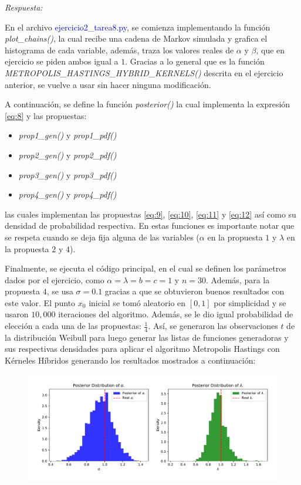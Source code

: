 \textcolor{BrickRed}{\it Respuesta:}

En el archivo \textcolor{mediumblue}{ejercicio2\_tarea8.py}, se comienza implementando la función \textit{plot\_chains()}, la cual recibe una cadena de Markov simulada y grafica el histograma de cada variable, además, traza los valores reales de $\alpha$ y $\beta$, que en ejercicio se piden ambos igual a $1$. Gracias a lo general que es la función \textit{METROPOLIS\_HASTINGS\_HYBRID\_KERNELS()} descrita en el ejercicio anterior, se vuelve a usar sin hacer ninguna modificación.

A continuación, se define la función \textit{posterior()} la cual implementa la expresión \eqref{eq:8} y las propuestas:
\begin{itemize}
	\item \textit{prop1\_gen()}  y \textit{prop1\_pdf()}
	\item \textit{prop2\_gen()} y \textit{prop2\_pdf()}
	\item \textit{prop3\_gen()}  y \textit{prop3\_pdf()}
	\item \textit{prop4\_gen()} y \textit{prop4\_pdf()}
\end{itemize}
las cuales implementan las propuestas \eqref{eq:9}, \eqref{eq:10}, \eqref{eq:11} y \eqref{eq:12} así como su densidad de probabilidad respectiva. En estas funciones es importante notar que se respeta cuando se deja fija alguna de las variables ($\alpha$ en la propuesta $1$ y  $\lambda$ en la propuesta $2$ y $4$).

Finalmente, se ejecuta el código principal, en el cual se definen los parámetros dados por el ejercicio, como $\alpha=\lambda=b=c=1$ y $n= 30$. Además, para la propuesta $4$, se usa $\sigma=0.1$ gracias a que se obtuvieron buenos resultados con este valor. El punto $x_0$ inicial se tomó aleatorio en $[0,1]$ por simplicidad y se usaron $10,000$ iteraciones del algoritmo. Además, se le dio igual probabilidad de elección a cada una de las propuestas: $\frac{1}{4}$. Así, se generaron las observaciones $t$ de la distribución Weibull para luego generar las listas de funciones generadoras y sus respectivas densidades para aplicar el algoritmo Metropolis Hastings con Kérneles Híbridos generando los resultados mostrados a continuación:

\begin{figure}[h!]
	\centering
	\includegraphics[width=\textwidth]{IMAGENES/exercise2.pdf}
\end{figure}


